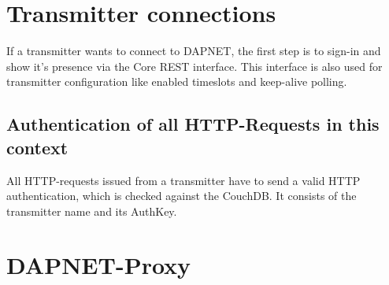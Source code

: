 \section{Transmitter connections}
If a transmitter wants to connect to DAPNET, the first step is to sign-in and show it's presence via the Core REST interface. This interface is also used for transmitter configuration like enabled timeslots and keep-alive polling.

\subsection{Authentication of all HTTP-Requests in this context}
All HTTP-requests issued from a transmitter have to send a valid HTTP authentication, which is checked against the CouchDB. It consists of the transmitter name and its AuthKey.

\section{DAPNET-Proxy}